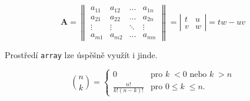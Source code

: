 \documentclass[a4paper, 11pt, twocolumn]{article}
\begin{document}
    \begin{equation}
        \nonumber
        \textbf{A} = \left\|
        \begin{array}{cccc}
            a_{11} & a_{12} & \ldots & a_{1n} \\
            a_{21} & a_{22} & \ldots & a_{2n} \\
            \vdots & \vdots & \ddots & \vdots \\
            a_{m1} & a_{m2} & \ldots & a_{mn}
        \end{array}
        \right\| = \left|
        \begin{array}{rl}
            t & u \\
            v & w
        \end{array}
        \right| = tw{-}uv
    \end{equation}

    Prostředí \texttt{array} lze úspěšně využít i jinde.

    \begin{displaymath}
        \binom{n}{k} = \left\{
        \begin{array}{cl}
            0 & \text{pro } k\;< 0 \text{ nebo } k\;> n \\
            \frac{n!}{k!(n-k)!} & \text{pro } 0 \leq k\;\leq n.
        \end{array} \right.
    \end{displaymath}
\end{document}
